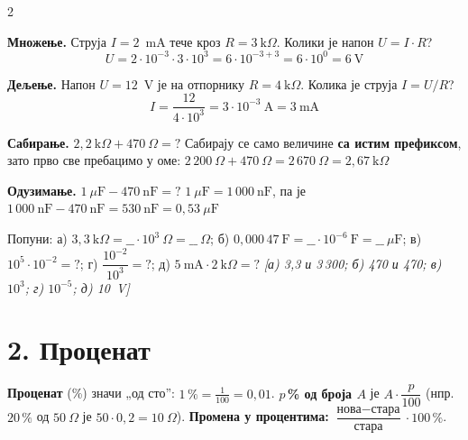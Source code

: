 \documentclass[10pt]{article}
\begin{document}
\begin{multicols}{2}

\begin{primer}
\textbf{Множење.} Струја $I = 2$~mA тече кроз $R = 3~\text{k}\Omega$.
Колики је напон $U = I\cdot R$?
\[
U = 2\cdot 10^{-3}\cdot 3\cdot 10^{3} = 6\cdot 10^{-3+3} = 6\cdot 10^{0} = 6~\text{V}
\]
\end{primer}

\begin{primer}
\textbf{Дељење.} Напон $U = 12$~V је на отпорнику $R = 4~\text{k}\Omega$.
Колика је струја $I = U/R$?
\[
I = \frac{12}{4\cdot 10^{3}} = 3\cdot 10^{-3}~\text{A} = 3~\text{mA}
\]
\end{primer}

\columnbreak

\begin{primer}
\textbf{Сабирање.} $2{,}2~\text{k}\Omega + 470~\Omega = ?$
Сабирају се само величине \textbf{са истим префиксом}, зато прво све
пребацимо у оме:
$2\,200~\Omega + 470~\Omega = 2\,670~\Omega = 2{,}67~\text{k}\Omega$
\end{primer}

\begin{primer}
\textbf{Одузимање.} $1~\mu\text{F} - 470~\text{nF} = ?$
$1~\mu\text{F} = 1\,000~\text{nF}$, па је
$1\,000~\text{nF} - 470~\text{nF} = 530~\text{nF} = 0{,}53~\mu\text{F}$
\end{primer}

\end{multicols}
\vspace{-10pt}

\begin{zadatak}
Попуни: а) $3{,}3~\text{k}\Omega = \_\_\cdot 10^{3}~\Omega = \_\_~\Omega$; \;
б) $0{,}000\,47~\text{F} = \_\_\cdot 10^{-6}~\text{F} = \_\_~\mu\text{F}$; \;
в) $10^{5}\cdot 10^{-2} = ?$; \; г) $\dfrac{10^{-2}}{10^{3}} = ?$; \;
д) $5~\text{mA}\cdot 2~\text{k}\Omega = ?$
\hfill\textit{[а) 3,3 и 3\,300; б) 470 и 470; в) $10^{3}$; г) $10^{-5}$; д) 10~V]}
\end{zadatak}

\section*{2. Проценат}

\textbf{Проценат} (\%) значи „од сто”: $1\,\% = \frac{1}{100} = 0{,}01$.
\quad \textbf{$p$\,\% од броја $A$} је $A\cdot\dfrac{p}{100}$
\quad (нпр. $20\,\%$ од $50~\Omega$ је $50\cdot 0{,}2 = 10~\Omega$).
\quad \textbf{Промена у процентима:} $\dfrac{\text{нова} - \text{стара}}{\text{стара}}\cdot 100\,\%$.
\end{document}
